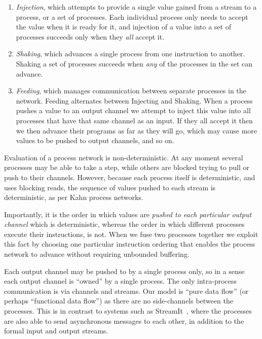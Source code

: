 \begin{enumerate}
\item \emph{Injection}, which attempts to provide a single value gained from a stream to a process, or a set of processes. Each individual process only needs to accept the value when it is ready for it, and injection of a value into a set of processes succeeds only when they \emph{all} accept it.

\item \emph{Shaking}, which advances a single process from one instruction to another. Shaking a set of processes succeeds when \emph{any} of the processes in the set can advance.

\item \emph{Feeding}, which manages communication between separate processes in the network. Feeding alternates between Injecting and Shaking. When a process pushes a value to an output channel we attempt to inject this value into all processes that have that same channel as an input. If they all accept it then we then advance their programs as far as they will go, which may cause more values to be pushed to output channels, and so on.

\end{enumerate}

Evaluation of a process network is non-deterministic. At any moment several processes may be able to take a step, while others are blocked trying to pull or push to their channels. However, because each process itself is deterministic, and uses blocking reads, the sequence of values pushed to each stream is deterministic, as per Kahn process networks. 

Importantly, it is the order in which values are \emph{pushed to each particular output channel} which is deterministic, whereas the order in which different processes execute their instructions, is not. When we fuse two processes together we exploit this fact by choosing one particular instruction ordering that enables the process network to advance without requiring unbounded buffering.

Each output channel may be pushed to by a single process only, so in a sense each output channel is ``owned'' by a single process. The only intra-process communication is via channels and streams. Our model is ``pure data flow'' (or perhaps ``functional data flow'') as there are no side-channels between the processes. This is in contrast to systems such as StreamIt~\cite{thies2002streamit}, where the processes are also able to send asynchronous messages to each other, in addition to the formal input and output streams.


